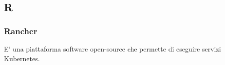 \subsection*{\textbf{\hfill \Huge{R} \hfill}} 
\subsubsection*{Rancher}
E' una piattaforma software open-source che permette di eseguire servizi Kubernetes\glos.